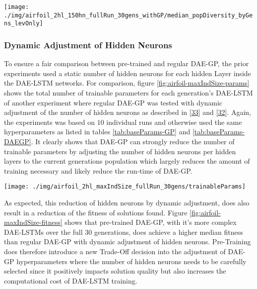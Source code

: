 \documentclass[
  11pt,
]{article}
\let\origfigure\figure
\let\endorigfigure\endfigure
\renewenvironment{figure}[1][2] {
    \expandafter\origfigure\expandafter[H]
} {
    \endorigfigure
}
\begin{document}
\begin{figure}[c]

{\centering \texttt{[image: ./img/airfoil\_2hl\_150hn\_fullRun\_30gens\_withGP/median\_popDiversity\_byGens\_levOnly]} 

}

\caption{Median Population Diversity over 30 Generations - Airfoil}\label{fig:airfoil-popDiversity}
\end{figure}

\hypertarget{dynamic-adjustment-of-hidden-neurons}{%
\subsubsection{Dynamic Adjustment of Hidden Neurons}\label{dynamic-adjustment-of-hidden-neurons}}

To ensure a fair comparison between pre-trained and regular DAE-GP, the prior experiments used a static number of hidden neurons for each hidden Layer inside the DAE-LSTM networks. For comparison, figure \ref{fig:airfoil-maxIndSize-params} shows the total number of trainable parameters for each generation's DAE-LSTM of another experiment where regular DAE-GP was tested with dynamic adjustment of the number of hidden neurons as described in {[}\protect\hyperlink{ref-dae-gp_2020_rtree}{33}{]} and {[}\protect\hyperlink{ref-dae-gp_2022_symreg}{32}{]}. Again, the experiments was based on \(10\) individual runs and otherwise used the same hyperparameters as listed in tables \ref{tab:baseParams-GP} and \ref{tab:baseParams-DAEGP}. It clearly shows that DAE-GP can strongly reduce the number of trainable parameters by adjusting the number of hidden neurons per hidden layers to the current generations population which largely reduces the amount of training necessary and likely reduce the run-time of DAE-GP.

\begin{figure}[c]

{\centering \texttt{[image: ./img/airfoil\_2hl\_maxIndSize\_fullRun\_30gens/trainableParams]} 

}

\caption{Median Number of trainable Parameters over 30 Generations - Airfoil - Dynamic adjustment of regular DAE-GP}\label{fig:airfoil-maxIndSize-params}
\end{figure}

As expected, this reduction of hidden neurons by dynamic adjustment, does also result in a reduction of the fitness of solutions found. Figure \ref{fig:airfoil-maxIndSize-fitness} shows that pre-trained DAE-GP, with it's more complex DAE-LSTMs over the full 30 generations, does achieve a higher median fitness than regular DAE-GP with dynamic adjustment of hidden neurons. Pre-Training does therefore introduce a new Trade-Off decision into the adjustment of DAE-GP hyperparameters where the number of hidden neurons needs to be carefully selected since it positively impacts solution quality but also increases the computational cost of DAE-LSTM training.
\end{document}
